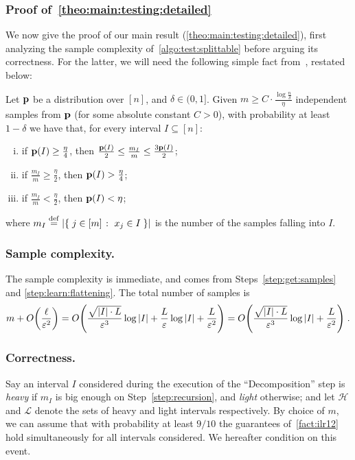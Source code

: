 \subsubsection{Proof of~\cref{theo:main:testing:detailed}}
We now give the proof of our main result (\cref{theo:main:testing:detailed}), first analyzing the sample complexity of~\cref{algo:test:splittable} before arguing its correctness. For the latter, we will need the following simple fact from~\cite{ILR:12}, restated below:
\begin{fact}\label{fact:ilr12}
Let $\mathbf{p}$ be a distribution over $[n]$, and $\delta \in (0,1]$. Given $m\geq C\cdot\frac{\log\frac{n}{\delta}}{\eta}$ independent samples from $\mathbf{p}$ (for some absolute constant $C>0$), with probability at least $1-\delta$ we have that, for every interval $I\subseteq[n]$:
\begin{enumerate}[(i)]
  \item\label{fact:ilr12:1} if $\mathbf{p}(I) \geq \frac{\eta}{4}$, then $\frac{\mathbf{p}(I)}{2} \leq \frac{m_I}{m} \leq \frac{3\mathbf{p}(I)}{2}$;
  \item\label{fact:ilr12:2} if $\frac{m_I}{m} \geq \frac{\eta}{2}$, then $\mathbf{p}(I) > \frac{\eta}{4}$;
  \item\label{fact:ilr12:3} if $\frac{m_I}{m} < \frac{\eta}{2}$, then $\mathbf{p}(I) < \eta$;
\end{enumerate}
where $m_I \stackrel{\rm def}{=} \left\lvert  \left\{\; j\in[m] \;\colon\; x_j \in I \; \right\}  \right\rvert$ is the number of the samples falling into $I$.
\end{fact}

\subsubsection{Sample complexity.}
The sample complexity is immediate, and comes from Steps~\ref{step:get:samples} and \ref{step:learn:flattening}. The total number of samples is
\[
  m+\bigO{\frac{\ell}{\eps^2}} = \bigO{ \frac{\sqrt{\abs{I}\cdot L}}{\eps^3} \log \abs{I} + \frac{L}{\eps}\log \abs{I} + \frac{L}{\eps^2} }
   = \bigO{ \frac{\sqrt{\abs{I}\cdot L}}{\eps^3}\log \abs{I} + \frac{L}{\eps^2} }\;.
\]
\subsubsection{Correctness.}
Say an interval $I$ considered during the execution of the ``Decomposition'' step is \emph{heavy} if $m_I$ is big enough on Step~\ref{step:recursion}, and \emph{light} otherwise; and let $\mathscr{H}$ and $\mathscr{L}$ denote the sets of heavy and light intervals respectively. By choice of $m$, we can assume that with probability at least $9/10$ the guarantees of~\cref{fact:ilr12} hold simultaneously for all intervals considered. We hereafter condition on this event.\medskip 

